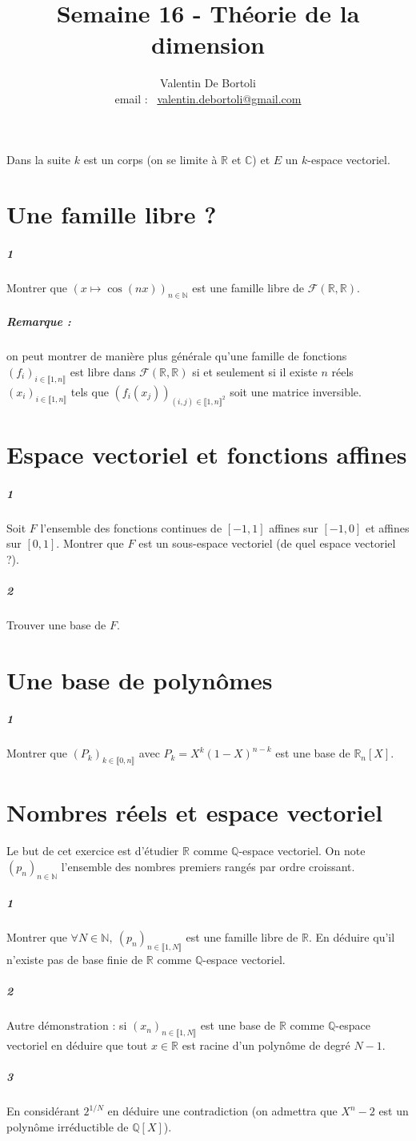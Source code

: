 \documentclass[10pt,a4paper]{article}
\title{Semaine 16 - Théorie de la dimension}
\author{Valentin De Bortoli \\ email : \ \href{mailto:valentin.debortoli@gmail.com}{valentin.debortoli@gmail.com}}
\date{}
\begin{document}
\maketitle
Dans la suite $k$ est un corps (on se limite à $\mathbb{R}$ et $\mathbb{C}$) et $E$ un $k$-espace vectoriel.

\section{Une famille libre ?}
\subparagraph{1}Montrer que $(x \mapsto\cos(nx))_{n \in \mathbb{N}}$ est une famille libre de $\mathcal{F}(\mathbb{R},\mathbb{R})$.

\subparagraph{Remarque :} on peut montrer de manière plus générale qu'une famille de fonctions $(f_i)_{i \in \llbracket 1,n \rrbracket}$ est libre dans $\mathcal{F}(\mathbb{R},\mathbb{R})$ si et seulement si il existe $n$ réels $(x_i)_{i \in \llbracket 1,n \rrbracket}$ tels que $(f_i(x_j))_{(i,j) \in \llbracket 1,n\rrbracket^2}$ soit une matrice inversible. 

\section{Espace vectoriel et fonctions affines}
\subparagraph{1}Soit $F$ l'ensemble des fonctions continues de $[-1,1]$ affines sur $[-1,0]$ et affines sur $[0,1]$. Montrer que $F$ est un sous-espace vectoriel (de quel espace vectoriel ?).
\subparagraph{2}Trouver une base de $F$. 

\section{Une base de polynômes}
\subparagraph{1}Montrer que $(P_k)_{k \in \llbracket 0,n \rrbracket}$ avec $P_k=X^k(1-X)^{n-k}$ est une base de $\mathbb{R}_n[X]$. 

\section{Nombres réels et espace vectoriel}
Le but de cet exercice est d'étudier $\mathbb{R}$ comme $\mathbb{Q}$-espace vectoriel. On note $(p_n)_{n \in \mathbb{N}}$ l'ensemble des nombres premiers rangés par ordre croissant.
\subparagraph{1} Montrer que $\forall N \in \mathbb{N}, \ (p_n)_{n \in \llbracket 1,N \rrbracket}$ est une famille libre de $\mathbb{R}$. En déduire qu'il n'existe pas de base finie de $\mathbb{R}$ comme $\mathbb{Q}$-espace vectoriel.
\subparagraph{2} Autre démonstration : si $(x_n)_{n \in \llbracket 1,N \rrbracket}$ est une base de $\mathbb{R}$ comme $\mathbb{Q}$-espace vectoriel en déduire que tout $x\in \mathbb{R}$ est racine d'un polynôme de degré $N-1$.
\subparagraph{3}En considérant $2^{1/N}$ en déduire une contradiction (on admettra que $X^n-2$ est un polynôme irréductible de $\mathbb{Q}[X]$).
\end{document}
